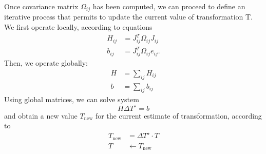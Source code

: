 \documentclass[a4paper, onecolumn]{report}
\begin{document}
Once covariance matrix $\Omega_{ij}$ has been computed, we can proceed to define an iterative process that permits to update the current value of transformation T. We first operate locally, according to equations
\begin{equation}
	\begin{aligned}
		H_{ij} &= J_{ij}^T\Omega_{ij}J_{ij} \\
		b_{ij} &= J_{ij}^T\Omega_{ij}e_{ij}.
	\end{aligned}
\end{equation}
Then, we operate globally:
\begin{equation}
	\begin{aligned}
		H &= \sum_{ij} H_{ij} \\
		b &= \sum_{ij} b_{ij}
	\end{aligned}
\end{equation}
Using global matrices, we can solve system 
\begin{equation}
	H\Delta T^\star = b
\end{equation}
and obtain a new value $T_{\mbox{new}}$ for the current estimate of transformation, according to
\begin{equation}
	\begin{aligned}
		T_{\mbox{new}} &= \Delta T^\star \cdot T \\
		T  &\leftarrow  T_{\mbox{new}} 
	\end{aligned}
\end{equation}
\end{document}

